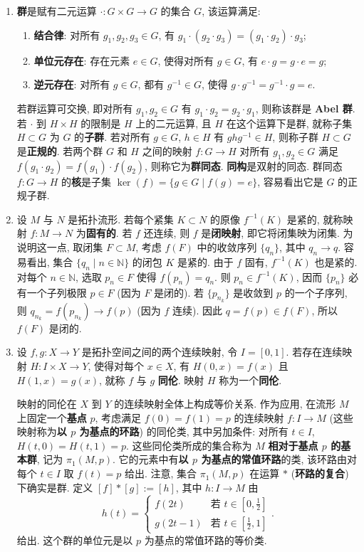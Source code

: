 \begin{enumerate}[label=(\arabic*),leftmargin=*]
\item \textbf{群}是赋有二元运算 $\cdot:G\times G\to G$ 的集合 $G$, 该运算满足:
\begin{enumerate}[label=(\roman*),leftmargin=*]
\item \textbf{结合律}: 对所有 $g_1,g_2,g_3\in G$, 有 $g_1\cdot(g_2\cdot g_3)=(g_1\cdot g_2)\cdot g_3$;
\item \textbf{单位元存在}: 存在元素 $e\in G$, 使得对所有 $g\in G$, 有 $e\cdot g=g\cdot e=g$;
\item \textbf{逆元存在}: 对所有 $g\in G$, 都有 $g^{-1}\in G$, 使得 $g\cdot g^{-1}=g^{-1}\cdot g=e$.
\end{enumerate}
若群运算可交换, 即对所有 $g_1,g_2\in G$ 有 $g_1\cdot g_2=g_2\cdot g_1$, 则称该群是 \textbf{Abel 群}. 若 $\cdot$ 到 $H\times H$ 的限制是 $H$ 上的二元运算, 且 $H$ 在这个运算下是群, 就称子集 $H\subset G$ 为 $G$ 的\textbf{子群}. 若对所有 $g\in G$, $h\in H$ 有 $ghg^{-1}\in H$, 则称子群 $H\subset G$ 是\textbf{正规的}. 若两个群 $G$ 和 $H$ 之间的映射 $f:G\to H$ 对所有 $g_1,g_2\in G$ 满足 $f(g_1\cdot g_2)=f(g_1)\cdot f(g_2)$, 则称它为\textbf{群同态}. \textbf{同构}是双射的同态. 群同态 $f:G\to H$ 的\textbf{核}是子集 $\ker(f)=\{g\in G\mid f(g)=e\}$, 容易看出它是 $G$ 的正规子群.
\item 设 $M$ 与 $N$ 是拓扑流形. 若每个紧集 $K\subset N$ 的原像 $f^{-1}(K)$ 是紧的, 就称映射 $f:M\to N$ 为\textbf{固有的}. 若 $f$ 还连续, 则 $f$ 是\textbf{闭映射}, 即它将闭集映为闭集. 为说明这一点, 取闭集 $F\subset M$, 考虑 $f(F)$ 中的收敛序列 $\{q_n\}$, 其中 $q_n\to q$. 容易看出, 集合 $\{q_n\mid n\in\mathbb{N}\}$ 的闭包 $K$ 是紧的. 由于 $f$ 固有, $f^{-1}(K)$ 也是紧的. 对每个 $n\in\mathbb{N}$, 选取 $p_n\in F$ 使得 $f(p_n)=q_n$. 则 $p_n\in f^{-1}(K)$, 因而 $\{p_n\}$ 必有一个子列极限 $p\in F$ (因为 $F$ 是闭的). 若 $\{p_{n_k}\}$ 是收敛到 $p$ 的一个子序列, 则 $q_{n_k}=f(p_{n_k})\to f(p)$ (因为 $f$ 连续). 因此 $q=f(p)\in f(F)$, 所以 $f(F)$ 是闭的.
\item 设 $f,g:X\to Y$ 是拓扑空间之间的两个连续映射, 令 $I=[0,1]$. 若存在连续映射 $H:I\times X\to Y$, 使得对每个 $x\in X$, 有 $H(0,x)=f(x)$ 且 $H(1,x)=g(x)$, 就称 $f$ 与 $g$ \textbf{同伦}. 映射 $H$ 称为一个\textbf{同伦}.

映射的同伦在 $X$ 到 $Y$ 的连续映射全体上构成等价关系. 作为应用, 在流形 $M$ 上固定一个\textbf{基点} $p$, 考虑满足 $f(0)=f(1)=p$ 的连续映射 $f:I\to M$ (这些映射称为\textbf{以 $p$ 为基点的环路}) 的同伦类, 其中另加条件: 对所有 $t\in I$, $H(t,0)=H(t,1)=p$. 这些同伦类所成的集合称为 $M$ \textbf{相对于基点 $p$ 的基本群}, 记为 $\pi_1(M,p)$. 它的元素中有\textbf{以 $p$ 为基点的常值环路}的类, 该环路由对每个 $t\in I$ 取 $f(t)=p$ 给出. 注意, 集合 $\pi_1(M,p)$ 在运算 $*$ (\textbf{环路的复合}) 下确实是群. 定义 $[f]*[g]:=[h]$, 其中 $h:I\to M$ 由
\[
  h(t)=\begin{cases}
    f(2t)&\text{若 }t\in[0,\frac12]\\
    g(2t-1)&\text{若 }t\in[\frac12,1]
  \end{cases}.
\]
给出. 这个群的单位元是以 $p$ 为基点的常值环路的等价类.


\end{enumerate}
